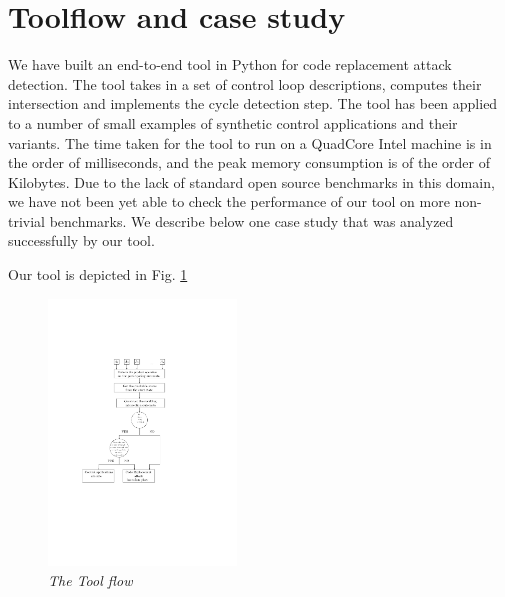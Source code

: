 \section{Toolflow and case study} \label{sec5}
\noindent
We have built an end-to-end tool in Python for code replacement attack detection.
The tool takes in a set of control loop descriptions, computes their intersection and 
implements the cycle detection step. The tool has been applied to a number of small 
examples of synthetic control applications and their variants. The time taken for
the tool to run on a QuadCore Intel machine is in the order of milliseconds, and the
peak memory consumption is of the order of Kilobytes. Due to the lack of standard open
source benchmarks in this domain, we have not been yet able to check the performance of
our tool on more non-trivial benchmarks. We describe below one case study that was analyzed 
successfully by our tool.

Our tool is depicted in Fig. \ref{tool_algorithm}

\begin{figure}
\begin{center}
\includegraphics[width=50mm]{algorithm.pdf}
\end{center}
\caption{{\em The Tool flow}}
\label{tool_algorithm}
\end{figure}
